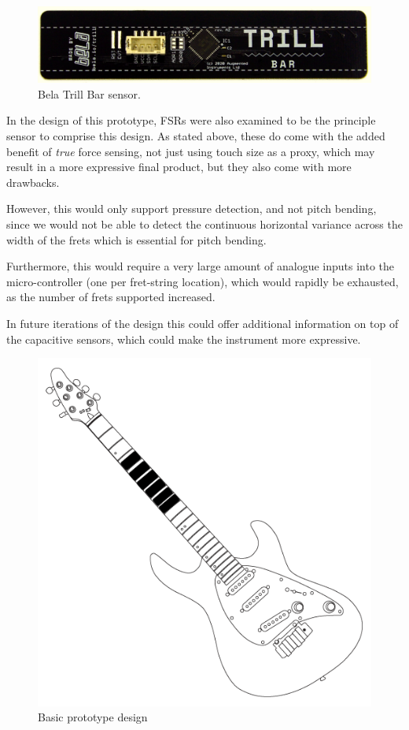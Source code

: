 \begin{figure}[h]
    \centering
    \includegraphics[scale=0.25]{Images/trill back.PNG}
    \caption{Bela Trill Bar sensor. }
    \label{fig:trill_picture}
\end{figure}

In the design of this prototype, FSRs were also examined to be the principle sensor to comprise this design. As stated above, these do come with the added benefit of \textit{true} force sensing, not just using touch size as a proxy, which may result in a more expressive final product, but they also come with more drawbacks. 

However, this would only support pressure detection, and not pitch bending, since we would not be able to detect the continuous horizontal variance across the width of the frets which is essential for pitch bending. 

Furthermore, this would require a very large amount of analogue inputs into the micro-controller (one per fret-string location), which would rapidly be exhausted, as the number of frets supported increased. 

In future iterations of the design this could offer additional information on top of the capacitive sensors, which could make the instrument more expressive. 

\begin{figure}
    \centering
    \includegraphics[scale=0.65]{Images/NEWGUITA.png}
    \caption{Basic prototype design}
    \label{fig:proposed}
\end{figure}

